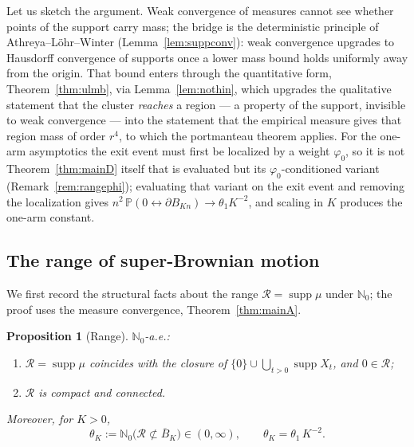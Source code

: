 \documentclass[11pt]{article}
\newtheorem{proposition}[theorem]{Proposition}
\theoremstyle{definition}
\theoremstyle{remark}
\newcommand{\bP}{\mathbb{P}}
\newcommand{\bN}{{\mathbb{N}_0}}                 %
\newcommand{\supp}{\operatorname{supp}}
\newcommand{\Ran}{\mathcal{R}}                 %
\numberwithin{equation}{section}
\theoremstyle{plain}
\theoremstyle{definition}
\theoremstyle{remark}
\theoremstyle{plain}
\begin{document}
Let us sketch the argument. Weak convergence of measures cannot see whether
points of the support carry mass; the bridge is the deterministic principle of
Athreya--L\"ohr--Winter (Lemma~\ref{lem:suppconv}): weak convergence upgrades
to Hausdorff convergence of supports once a lower mass bound holds uniformly
away from the origin. That bound enters through the quantitative form,
Theorem~\ref{thm:ulmb}, via Lemma~\ref{lem:nothin}, which upgrades the
qualitative statement that the cluster \emph{reaches} a region --- a property
of the support, invisible to weak convergence --- into the statement that the
empirical measure gives that region mass of order $r^4$, to which the
portmanteau theorem applies. For the one-arm asymptotics the exit event must first be
localized by a weight $\varphi_0$, so it is not Theorem~\ref{thm:mainD}
itself that is evaluated but its $\varphi_0$-conditioned variant
(Remark~\ref{rem:rangephi}); evaluating that variant on the exit event and
removing the localization gives
$n^2\,\bP(0\leftrightarrow\partial B_{Kn})\to\theta_1K^{-2}$, and scaling in
$K$ produces the one-arm constant.



\subsection{The range of super-Brownian motion}

We first record the structural facts about the range $\Ran=\supp\mu$ under
$\bN$; the proof uses the measure convergence, Theorem~\ref{thm:mainA}.

\begin{proposition}[Range]\label{prop:range}
$\bN$-a.e.:
\begin{enumerate}
\item[\rm(i)] $\Ran=\supp\mu$ coincides with the closure of
$\{0\}\cup\bigcup_{t>0}\supp X_t$, and $0\in\Ran$;
\item[\rm(ii)] $\Ran$ is compact and connected.
\end{enumerate}
Moreover, for $K>0$,
\[
\theta_K:=\bN\bigl(\Ran\not\subset\overline B_K\bigr)\in(0,\infty),
\qquad \theta_K=\theta_1\,K^{-2}.
\]
\end{proposition}
\end{document}
